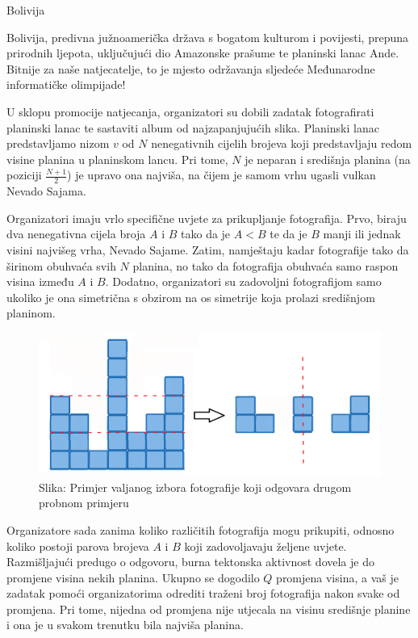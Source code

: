 \begin{statement}[
  problempoints=100,
  timelimit=2 sekunde,
  memorylimit=512 MiB,
]{Bolivija}

Bolivija, predivna južnoamerička država s bogatom kulturom i povijesti, 
prepuna prirodnih ljepota, uključujući dio Amazonske prašume te planinski lanac Ande. 
Bitnije za naše natjecatelje, to je mjesto održavanja sljedeće Međunarodne informatičke 
olimpijade! 

U sklopu promocije natjecanja, organizatori su dobili zadatak 
fotografirati planinski lanac te sastaviti album od najzapanjujućih slika.
Planinski lanac predstavljamo nizom $v$ od $N$ nenegativnih cijelih brojeva koji 
predstavljaju redom visine planina u planinskom lancu. 
Pri tome, $N$ je neparan i središnja planina (na poziciji $\frac{N+1}{2}$) je upravo ona najviša, 
na čijem je samom vrhu ugasli vulkan Nevado Sajama. 

Organizatori imaju vrlo specifične uvjete za prikupljanje fotografija. 
Prvo, biraju dva nenegativna cijela broja $A$ i $B$ tako da je $A < B$ te da je $B$ manji ili 
jednak visini najvišeg vrha, Nevado Sajame. 
Zatim, namještaju kadar fotografije tako da širinom obuhvaća svih $N$ planina, no tako 
da fotografija obuhvaća samo raspon visina između $A$ i $B$. 
Dodatno, organizatori su zadovoljni fotografijom samo ukoliko je ona simetrična s 
obzirom na os simetrije koja prolazi središnjom planinom. 

\begin{figure}[!h]
      \centering
      \includegraphics[width=\linewidth]{pic/planine.png}
      \caption*{Slika: Primjer valjanog izbora fotografije koji odgovara drugom probnom primjeru}
\end{figure}

Organizatore sada zanima koliko različitih fotografija mogu prikupiti, odnosno 
koliko postoji parova brojeva $A$ i $B$ koji zadovoljavaju željene uvjete. 
Razmišljajući predugo o odgovoru, burna tektonska aktivnost dovela je do promjene 
visina nekih planina. Ukupno se dogodilo $Q$ promjena visina, a vaš je zadatak 
pomoći organizatorima odrediti traženi broj fotografija nakon svake od promjena. 
Pri tome, nijedna od promjena nije utjecala na visinu središnje planine i ona je 
u svakom trenutku bila najviša planina. 


\end{statement}
